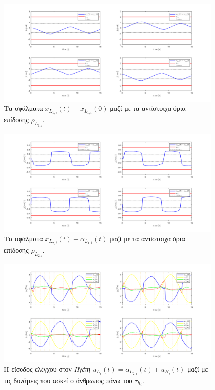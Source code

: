 \begin{figure}[H]
    \centering
    \includegraphics[width=1\linewidth]{Chapters/Chapter3/Figures/Sim2Fig7.png}
    \caption{Τα σφάλματα $x_{L_{1,i}}(t) - x_{L_{1,i}}(0)$ μαζί με τα αντίστοιχα όρια επίδοσης $\rho_{L_{1,i}}$.}
    \label{Sim2Fig7}
\end{figure}



\begin{figure}[H]
    \centering
    \includegraphics[width=1\linewidth]{Chapters/Chapter3/Figures/Sim2Fig8.png}
    \caption{Τα σφάλματα $x_{L_{2,i}}(t) - \alpha_{L_{1,i}}(t)$ μαζί με τα αντίστοιχα όρια επίδοσης $\rho_{L_{2,i}}$.}
    \label{Sim2Fig8}
\end{figure}

\begin{figure}[H]
    \centering
    \includegraphics[width=1\linewidth]{Chapters/Chapter3/Figures/Sim2Fig9.png}
    \caption{Η είσοδος ελέγχου στον \textit{Ηγέτη} $u_{L_{i}}(t) = \alpha_{L_{2,i}}(t) + u_{H_{i}}(t)$ μαζί με τις δυνάμεις που ασκεί ο άνθρωπος πάνω του $\tau_{h_{i}}$.}
    \label{Sim2Fig9}
\end{figure}

